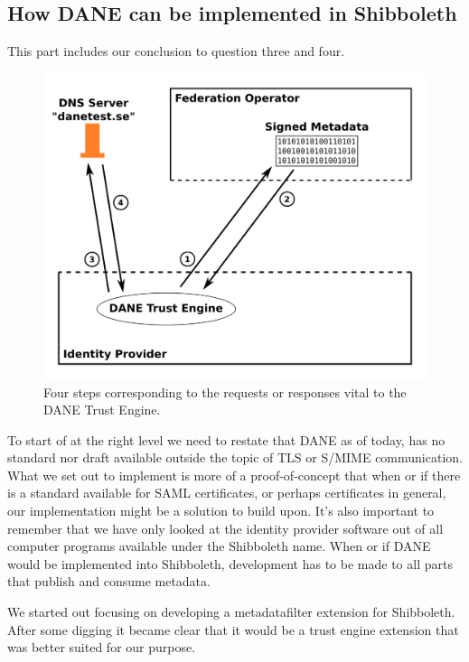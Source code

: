 \subsection{How DANE can be implemented in Shibboleth}
This part includes our conclusion to question three and four.

\begin{figure}[ht]
\begin{center}
\includegraphics[scale=1]{Figures/dane-impl.png}
\end{center}
\caption{Four steps corresponding to the requests or responses vital to the DANE Trust Engine.
\label{ch5:dane-impl}}
\end{figure}


To start of at the right level we need to restate that DANE as of today, has no standard nor draft available outside the topic of TLS or S/MIME communication.
What we set out to implement is more of a proof-of-concept that when or if there is a standard available for SAML certificates, or perhaps certificates in general, our implementation might be a solution to build upon.
It's also important to remember that we have only looked at the identity provider software out of all computer programs available under the Shibboleth name.
When or if DANE would be implemented into Shibboleth, development has to be made to all parts that publish and consume metadata.

We started out focusing on developing a metadatafilter extension for Shibboleth.
After some digging it became clear that it would be a trust engine extension that was better suited for our purpose.

